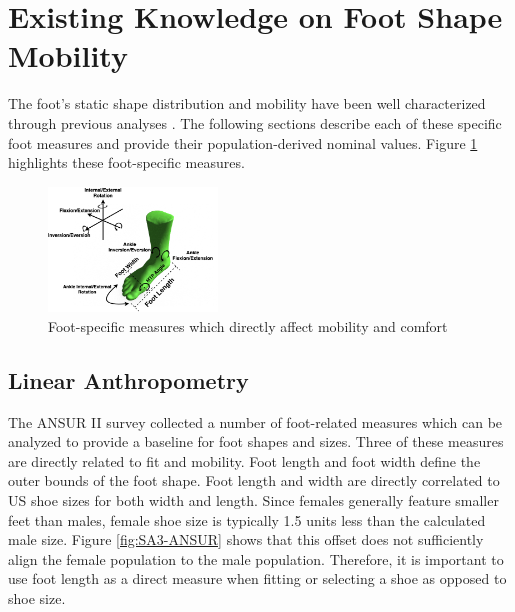 \documentclass[defaultstyle,11pt]{comps}
\begin{document}
\hypertarget{existing-knowledge-on-foot-shape-mobility}{%
\section{Existing Knowledge on Foot Shape Mobility}\label{existing-knowledge-on-foot-shape-mobility}}

The foot's static shape distribution and mobility have been well characterized through previous analyses \citep{Farris2019, Mann1979, Voloshina2013, Wannop2014}.
The following sections describe each of these specific foot measures and provide their population-derived nominal values.
Figure \ref{fig:SA3-Foot} highlights these foot-specific measures.

\begin{figure}
\hypertarget{fig:SA3-Foot}{%
\centering
\includegraphics[width=0.4\textwidth,height=\textheight]{../fig/SA3/FootOverview.png}
\caption{Foot-specific measures which directly affect mobility and comfort}\label{fig:SA3-Foot}
}
\end{figure}

\hypertarget{linear-anthropometry}{%
\subsection{Linear Anthropometry}\label{linear-anthropometry}}

The ANSUR II survey collected a number of foot-related measures which can be analyzed to provide a baseline for foot shapes and sizes\citep{Gordon2014}.
Three of these measures are directly related to fit and mobility.
Foot length and foot width define the outer bounds of the foot shape.
Foot length and width are directly correlated to US shoe sizes for both width and length.
Since females generally feature smaller feet than males, female shoe size is typically 1.5 units less than the calculated male size.
Figure \ref{fig:SA3-ANSUR} shows that this offset does not sufficiently align the female population to the male population.
Therefore, it is important to use foot length as a direct measure when fitting or selecting a shoe as opposed to shoe size.
\end{document}
